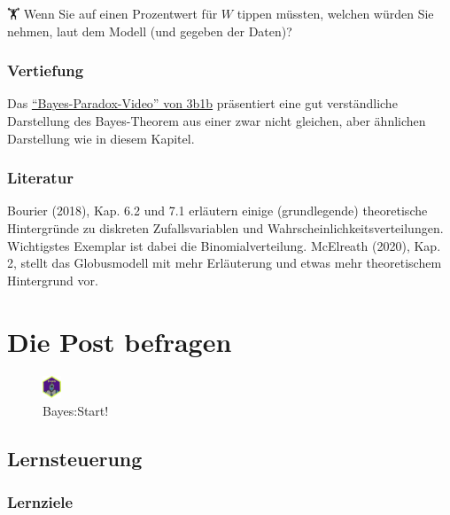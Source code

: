 \documentclass[
  a4paper,
  DIV=11]{scrreprt}
\theoremstyle{definition}
\theoremstyle{remark}
\begin{document}
🏋️ Wenn Sie auf einen Prozentwert für \(W\) tippen müssten, welchen
würden Sie nehmen, laut dem Modell (und gegeben der Daten)?

\hypertarget{vertiefung-1}{%
\subsection{Vertiefung}\label{vertiefung-1}}

Das \href{https://youtu.be/lG4VkPoG3ko}{``Bayes-Paradox-Video'' von
3b1b} präsentiert eine gut verständliche Darstellung des Bayes-Theorem
aus einer zwar nicht gleichen, aber ähnlichen Darstellung wie in diesem
Kapitel.

\hypertarget{literatur-2}{%
\subsection{Literatur}\label{literatur-2}}

Bourier (2018), Kap. 6.2 und 7.1 erläutern einige (grundlegende)
theoretische Hintergründe zu diskreten Zufallsvariablen und
Wahrscheinlichkeitsverteilungen. Wichtigstes Exemplar ist dabei die
Binomialverteilung. McElreath (2020), Kap. 2, stellt das Globusmodell
mit mehr Erläuterung und etwas mehr theoretischem Hintergrund vor.


\hypertarget{die-post-befragen}{%
\chapter{Die Post befragen}\label{die-post-befragen}}

\begin{figure}

{\centering \includegraphics[width=0.05\textwidth,height=\textheight]{./img/Golem_hex.png}

}

\caption{Bayes:Start!}

\end{figure}

\hypertarget{lernsteuerung-4}{%
\section{Lernsteuerung}\label{lernsteuerung-4}}

\hypertarget{lernziele-5}{%
\subsection{Lernziele}\label{lernziele-5}}
\end{document}
